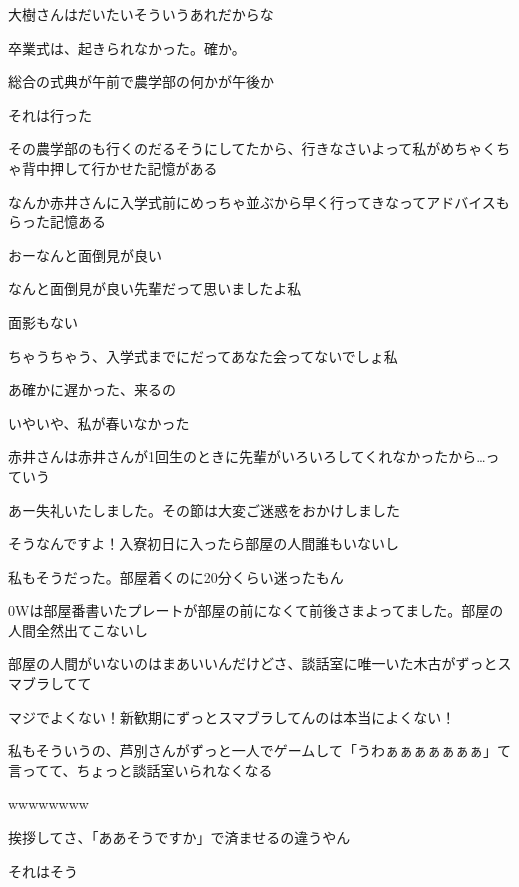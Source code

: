 \begin{multicols}{3}
大樹さんはだいたいそういうあれだからな

卒業式は、起きられなかった。確か。

総合の式典が午前で農学部の何かが午後か

それは行った

その農学部のも行くのだるそうにしてたから、行きなさいよって私がめちゃくちゃ背中押して行かせた記憶がある

\vspace{5mm}


\noindent{}

なんか赤井さんに入学式前にめっちゃ並ぶから早く行ってきなってアドバイスもらった記憶ある

おーなんと面倒見が良い

なんと面倒見が良い先輩だって思いましたよ私

面影もない

ちゃうちゃう、入学式までにだってあなた会ってないでしょ私

あ確かに遅かった、来るの

いやいや、私が春いなかった

赤井さんは赤井さんが1回生のときに先輩がいろいろしてくれなかったから…っていう

あー失礼いたしました。その節は大変ご迷惑をおかけしました

そうなんですよ！入寮初日に入ったら部屋の人間誰もいないし

私もそうだった。部屋着くのに20分くらい迷ったもん

0Wは部屋番書いたプレートが部屋の前になくて前後さまよってました。部屋の人間全然出てこないし

部屋の人間がいないのはまあいいんだけどさ、談話室に唯一いた木古がずっとスマブラしてて

マジでよくない！新歓期にずっとスマブラしてんのは本当によくない！

私もそういうの、芦別さんがずっと一人でゲームして「うわぁぁぁぁぁぁぁ」て言ってて、ちょっと談話室いられなくなる

wwwwwwww

挨拶してさ、「ああそうですか」で済ませるの違うやん

それはそう


\end{multicols}

